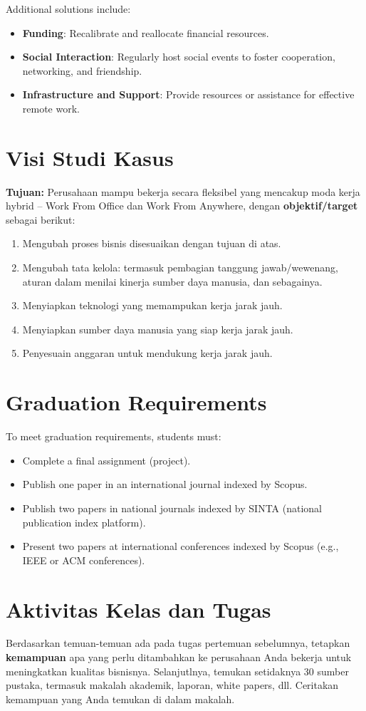 Additional solutions include:
\begin{itemize}
	\item \textbf{Funding}: Recalibrate and reallocate financial resources.
	\item \textbf{Social Interaction}: Regularly host social events to foster cooperation, networking, and friendship.
	\item \textbf{Infrastructure and Support}: Provide resources or assistance for effective remote work.
\end{itemize}

\section{Visi Studi Kasus}
\textbf{Tujuan:} Perusahaan mampu bekerja secara fleksibel yang mencakup moda kerja hybrid -- Work From Office dan Work From Anywhere, dengan \textbf{objektif/target} sebagai berikut:
\begin{enumerate}
	\item Mengubah proses bisnis disesuaikan dengan tujuan di atas.
	\item Mengubah tata kelola: termasuk pembagian tanggung jawab/wewenang, aturan dalam menilai kinerja sumber daya manusia, dan sebagainya.
	\item Menyiapkan teknologi yang memampukan kerja jarak jauh.
	\item Menyiapkan sumber daya manusia yang siap kerja jarak jauh.
	\item Penyesuain anggaran untuk mendukung kerja jarak jauh.
\end{enumerate}

\section{Graduation Requirements}

To meet graduation requirements, students must:
\begin{itemize}
	\item Complete a final assignment (project).
	\item Publish one paper in an international journal indexed by Scopus.
	\item Publish two papers in national journals indexed by SINTA (national publication index platform).
	\item Present two papers at international conferences indexed by Scopus (e.g., IEEE or ACM conferences).
\end{itemize}


\section{Aktivitas Kelas dan Tugas}
Berdasarkan temuan-temuan ada pada tugas pertemuan sebelumnya, tetapkan \textbf{kemampuan} apa yang perlu ditambahkan ke perusahaan Anda bekerja untuk meningkatkan kualitas bisnisnya. Selanjutlnya, temukan setidaknya 30 sumber pustaka, termasuk makalah akademik, laporan, white papers, dll.  Ceritakan kemampuan yang Anda temukan di dalam makalah.
